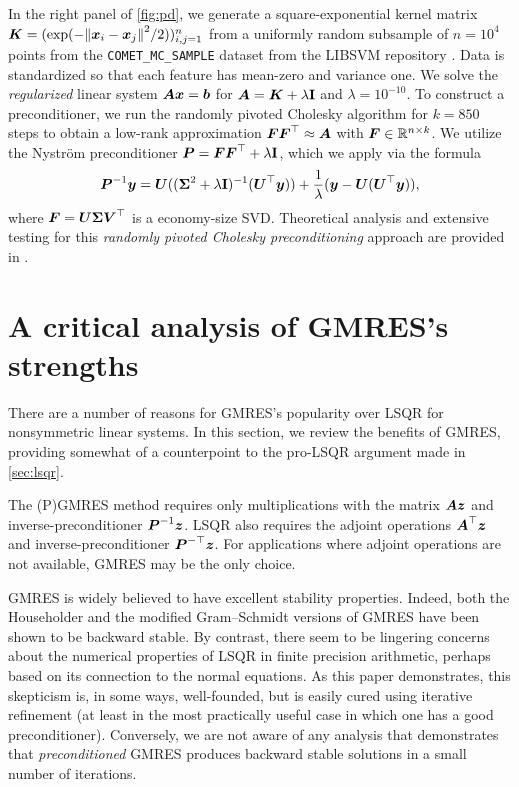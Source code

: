 \documentclass[onefignum,onetabnum,pagebackref,dvipsnames]{siamart220329}
\begin{document}
In the right panel of \cref{fig:pd}, we generate a square-exponential kernel matrix $\mat{K} = (\exp(-\norm{\vec{x}_i - \vec{x}_j}^2/2))_{i,j=1}^n$ from a uniformly random subsample of $n=10^4$ points from the \texttt{COMET\_MC\_SAMPLE} dataset from the LIBSVM repository \cite{chang2011libsvm}.
Data is standardized so that each feature has mean-zero and variance one.
We solve the \emph{regularized} linear system $\boldsymbol{A}\boldsymbol{x} = \boldsymbol{b}$ for $\boldsymbol{A} = \boldsymbol{K} + \lambda\mathbf{I}$ and $\lambda = 10^{-10}$.
To construct a preconditioner, we run the randomly pivoted Cholesky algorithm \cite{CETW25} for $k = 850$ steps to obtain a low-rank approximation $\boldsymbol{F}\boldsymbol{F}^\top \approx \boldsymbol{A}$ with $\boldsymbol{F} \in \mathbb{R}^{n\times k}$.
We utilize the Nystr\"om preconditioner \cite{FTU23,DEF+23} $\boldsymbol{P} = \boldsymbol{F}\boldsymbol{F}^\top + \lambda \mathbf{I}$, which we apply via the formula
%
\begin{equation*}
    \boldsymbol{P}^{-1}\boldsymbol{y} = \boldsymbol{U} ( (\boldsymbol{\Sigma}^2 + \lambda \mathbf{I})^{-1}(\boldsymbol{U}^\top\boldsymbol{y})) + \frac{1}{\lambda}(\boldsymbol{y} - \boldsymbol{U}(\boldsymbol{U}^\top\boldsymbol{y})),
\end{equation*}
%
where $\boldsymbol{F} = \boldsymbol{U}\boldsymbol{\Sigma}\boldsymbol{V}^\top$ is a economy-size SVD.
Theoretical analysis and extensive testing for this \emph{randomly pivoted Cholesky preconditioning} approach are provided in \cite{DEF+23}.

\section{A critical analysis of GMRES's strengths} \label{sec:gmres-strengths}
There are a number of reasons for GMRES's popularity over LSQR for nonsymmetric linear systems.
In this section, we review the benefits of GMRES, providing somewhat of a counterpoint to the pro-LSQR argument made in \cref{sec:lsqr}.

The (P)GMRES method requires only multiplications with the matrix $\boldsymbol{A}\boldsymbol{z}$ and inverse-preconditioner $\boldsymbol{P}^{-1}\boldsymbol{z}$.
LSQR also requires the adjoint operations $\boldsymbol{A}^\top\boldsymbol{z}$ and inverse-preconditioner $\boldsymbol{P}^{-\top}\boldsymbol{z}$.
For applications where adjoint operations are not available, GMRES may be the only choice.

GMRES is widely believed to have excellent stability properties.
Indeed, both the Householder \cite{DGRS95} and the modified Gram--Schmidt \cite{GRS97} versions of GMRES have been shown to be backward stable.
By contrast, there seem to be lingering concerns about the numerical properties of LSQR in finite precision arithmetic, perhaps based on its connection to the normal equations.
As this paper demonstrates, this skepticism is, in some ways, well-founded, but is easily cured using iterative refinement (at least in the most practically useful case in which one has a good preconditioner).
Conversely, we are not aware of any analysis that demonstrates that \emph{preconditioned} GMRES produces backward stable solutions in a small number of iterations.
\end{document}
